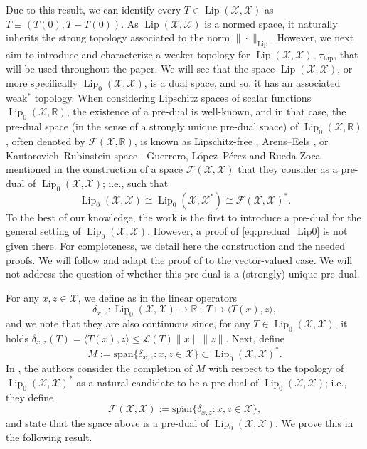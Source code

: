 \documentclass[onefignum,onetabnum]{siamonline250211}
\newcommand{\Lip}{\operatorname{Lip}}
\newcommand{\R}{\mathbb{R}}
\newcommand{\cX}{\mathcal{X}}
\begin{document}
Due to this result, we can identify every $T\in\Lip(\cX,\cX)$ as $T\equiv (T(0),T-T(0))$. As $\Lip(\cX, \cX)$ is a normed space, it naturally inherits the strong topology associated to the norm $\|\cdot\|_{\Lip}$. However, we next aim to introduce and characterize a weaker topology for $\Lip(\cX, \cX)$, $\tau_{\Lip}$, that will be used throughout the paper. We will see that the space $\Lip(\cX, \cX)$, or more specifically $\Lip_0(\cX, \cX)$, is a dual space, and so, it has an associated weak$^*$ topology. When considering Lipschitz spaces of scalar functions $\Lip_0(\cX,\R)$, the existence of a pre-dual is well-known, and in that case, the pre-dual space (in the sense of a strongly unique pre-dual space) of $\Lip_0(\cX,\R)$, often denoted by $\mathcal{F}(\cX, \R)$, is known as Lipschitz-free \cite{Cobzas2019, Godefroy03}, Arens--Eels \cite{Arens56,Weaver}, or Kantorovich--Rubinstein space \cite{Hanin92, Kantorovich82}. Guerrero, López--Pérez and Rueda Zoca mentioned in \cite{Guerrero2018} the construction of a space $\mathcal{F}(\cX, \cX)$ that they consider as a pre-dual of $\Lip_0(\cX, \cX)$; i.e., such that
\begin{equation}\label{eq:predual_Lip0}
\Lip_0(\cX, \cX)\cong \Lip_0(\cX, \cX^*) \cong \mathcal{F}(\cX, \cX)^*.
\end{equation}
To the best of our knowledge, the work \cite{Guerrero2018} is the first to introduce a pre-dual for the general setting of $\Lip_0(\cX, \cX)$. However, a proof of \cref{eq:predual_Lip0} is not given there. For completeness, we detail here the construction and the needed proofs. We will follow \cite[Section 8.2.2]{Cobzas2019} and adapt the proof of \cite[Theorem 8.2.7]{Cobzas2019} to the vector-valued case. We will not address the question of whether this pre-dual is a (strongly) unique pre-dual.

For any $x,z\in\cX$, we define as in \cite{Guerrero2018} the linear operators
\[
\delta_{x,z} \colon \Lip_0(\cX, \cX) \to \R \ ; \ T \mapsto \langle T(x),z\rangle,
\]
and we note that they are also continuous since, for any $T\in \Lip_0(\cX,\cX)$, it holds $\delta_{x,z}(T) = \langle T(x),z\rangle \leq \mathcal{L}(T) \|x\|\|z\|$. Next, define
\begin{equation}\label{eq:setM}
M := \text{span}\{\delta_{x,z} \colon x, z \in\cX\}\subset \Lip_0(\cX,\cX)^*.
\end{equation}
In \cite{Guerrero2018}, the authors consider the completion of $M$ with respect to the topology of $\Lip_0(\cX, \cX)^*$ as a natural candidate to be a pre-dual of $\Lip_0(\cX, \cX)$; i.e., they define
$$
\mathcal{F}(\cX, \cX):= \overline{\text{span}}\{\delta_{x,z} \colon x, z \in\cX\},
$$
and state that the space above is a pre-dual of $\Lip_0(\cX, \cX)$. We prove this in the following result.
\end{document}
